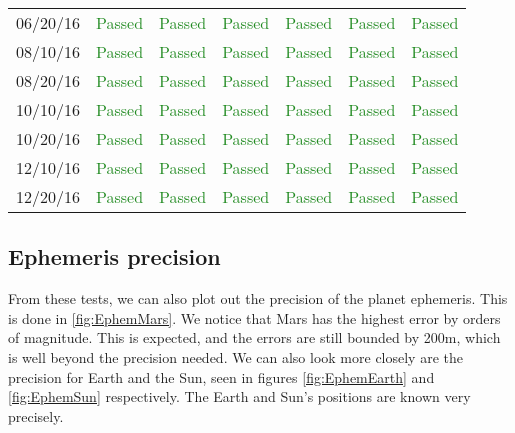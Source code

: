 \documentclass[]{BasiliskReportMemo}
\begin{document}
\begin{table}[htbp]
\begin{tabular}{c | c | c | c | c | c | c}
      06/20/16 & \textcolor{ForestGreen}{Passed} & \textcolor{ForestGreen}{Passed} &  \textcolor{ForestGreen}{Passed}&  \textcolor{ForestGreen}{Passed} & \textcolor{ForestGreen}{Passed} &  \textcolor{ForestGreen}{Passed}\\
      08/10/16 & \textcolor{ForestGreen}{Passed} & \textcolor{ForestGreen}{Passed} &  \textcolor{ForestGreen}{Passed}&  \textcolor{ForestGreen}{Passed} & \textcolor{ForestGreen}{Passed} &  \textcolor{ForestGreen}{Passed}\\
      08/20/16 & \textcolor{ForestGreen}{Passed} & \textcolor{ForestGreen}{Passed} &  \textcolor{ForestGreen}{Passed}&  \textcolor{ForestGreen}{Passed} & \textcolor{ForestGreen}{Passed} &  \textcolor{ForestGreen}{Passed}\\
      10/10/16 & \textcolor{ForestGreen}{Passed} & \textcolor{ForestGreen}{Passed} &  \textcolor{ForestGreen}{Passed}&  \textcolor{ForestGreen}{Passed} & \textcolor{ForestGreen}{Passed} &  \textcolor{ForestGreen}{Passed}\\
      10/20/16 & \textcolor{ForestGreen}{Passed} & \textcolor{ForestGreen}{Passed} &  \textcolor{ForestGreen}{Passed}&  \textcolor{ForestGreen}{Passed} & \textcolor{ForestGreen}{Passed} &  \textcolor{ForestGreen}{Passed}\\
      12/10/16 & \textcolor{ForestGreen}{Passed} & \textcolor{ForestGreen}{Passed} &  \textcolor{ForestGreen}{Passed}&  \textcolor{ForestGreen}{Passed} & \textcolor{ForestGreen}{Passed} &  \textcolor{ForestGreen}{Passed}\\
      12/20/16 & \textcolor{ForestGreen}{Passed} & \textcolor{ForestGreen}{Passed} &  \textcolor{ForestGreen}{Passed}&  \textcolor{ForestGreen}{Passed} & \textcolor{ForestGreen}{Passed} &  \textcolor{ForestGreen}{Passed}\\
      \hline
   \end{tabular}
\end{table}


\subsection{Ephemeris precision}

From these tests, we can also plot out the precision of the planet ephemeris. This is done in \ref{fig:EphemMars}. We notice that Mars has the highest error by orders of magnitude. This is expected, and the errors are still bounded by 200m, which is well beyond the precision needed. We can also look more closely are the precision for Earth and the Sun, seen in figures  \ref{fig:EphemEarth} and  \ref{fig:EphemSun} respectively. The Earth and Sun's positions are known very precisely. 




\end{document}
